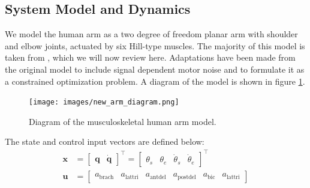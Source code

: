 \documentclass[letterpaper, 10pt, conference]{ieeeconf}
\begin{document}
\subsection{System Model and Dynamics}
We model the human arm as a two degree of freedom planar arm with shoulder and elbow joints, actuated by six Hill-type muscles. The majority of this model is taken from \cite{stochastic_model}, which we will now review here. Adaptations have been made from the original model to include signal dependent motor noise and to formulate it as a constrained optimization problem. A diagram of the model is shown in figure \ref{fig:arm_model}. 

\begin{figure}[h]
    \centering
    \texttt{[image: images/new\_arm\_diagram.png]}
    \caption{Diagram of the musculoskeletal human arm model. }
    \label{fig:arm_model}
\end{figure}

The state and control input vectors are defined below:
\begin{align}
    \mathbf{x} &= \begin{bmatrix}
        \mathbf{q} &
        \dot{\mathbf{q}}
    \end{bmatrix}^\top = \begin{bmatrix}
        \theta_s &
        \theta_e &
        \dot{\theta}_s &
        \dot{\theta}_e
    \end{bmatrix}^\top \\
    \mathbf{u} &= \begin{bmatrix}
        a_{\text{brach}} & a_{\text{lattri}} & a_{\text{antdel}} & a_{\text{postdel}} & a_{\text{bic}} & a_{\text{lattri}}
    \end{bmatrix}
\end{align}
\end{document}
